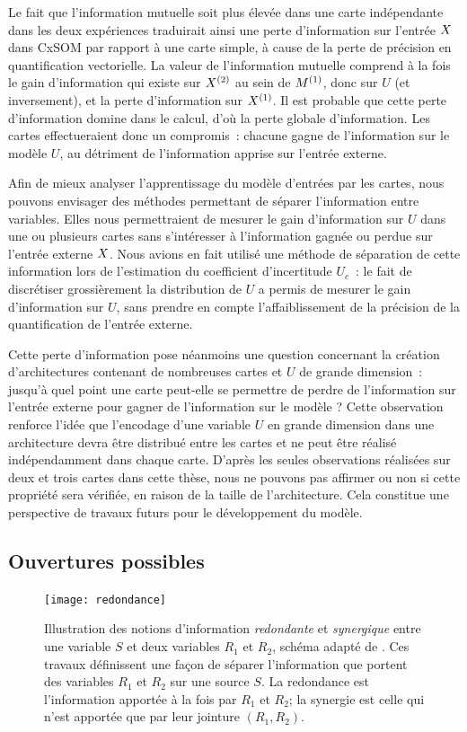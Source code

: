 \documentclass[../main]{subfiles}
\begin{document}
Le fait que l'information mutuelle soit plus élevée dans une carte indépendante dans les deux expériences traduirait ainsi une perte d'information sur l'entrée $X$ dans CxSOM par rapport à une carte simple, à cause de la perte de précision en quantification vectorielle. 
La valeur de l'information mutuelle comprend à la fois le gain d'information qui existe sur $X^{({2})}$ au sein de $M^{({1})}$, donc sur $U$ (et inversement), et la perte d'information sur $X^{({1})}$. 
Il est probable que cette perte d'information domine dans le calcul, d'où la perte globale d'information.
Les cartes effectueraient donc un compromis~: chacune gagne de l'information sur le modèle $U$, au détriment de l'information apprise sur l'entrée externe.

Afin de mieux analyser l'apprentissage du modèle d'entrées par les cartes, nous pouvons envisager des méthodes permettant de séparer l'information entre variables. Elles nous permettraient de mesurer le gain d'information sur $U$ dans une ou plusieurs cartes sans s'intéresser à l'information gagnée ou perdue sur l'entrée externe $X$.
Nous avions en fait utilisé une méthode de séparation de cette information lors de l'estimation du coefficient d'incertitude $U_c$~: le fait de discrétiser grossièrement la distribution de $U$ a permis de mesurer le gain d'information sur $U$, sans prendre en compte l'affaiblissement de la précision de la quantification de l'entrée externe.

Cette perte d'information pose néanmoins une question concernant la création d'architectures contenant de nombreuses cartes et $U$ de grande dimension~: jusqu'à quel point une carte peut-elle se permettre de perdre de l'information sur l'entrée externe pour gagner de l'information sur le modèle ? 
Cette observation renforce l'idée que l'encodage d'une variable $U$ en grande dimension dans une architecture devra être distribué entre les cartes et ne peut être réalisé indépendamment dans chaque carte. D'après les seules observations réalisées sur deux et trois cartes dans cette thèse, nous ne pouvons pas affirmer ou non si cette propriété sera vérifiée, en raison de la taille de l'architecture.
Cela constitue une perspective de travaux futurs pour le développement du modèle.

\subsection{Ouvertures possibles}

\begin{figure}
    \centering\texttt{[image: redondance]}
    \caption{Illustration des notions d'information \emph{redondante} et \emph{synergique} entre une variable $S$ et deux variables $R_1$ et $R_2$, schéma adapté de \cite{williams_nonnegative_2010}. Ces travaux définissent une façon de séparer l'information que portent des variables $R_1$ et $R_2$ sur une source $S$. La redondance est l'information apportée à la fois par $R_1$ et $R_2$; la synergie est celle qui n'est apportée que par leur jointure $(R_1,R_2)$. \label{fig:redondance}
    }
\end{figure}
\end{document}

